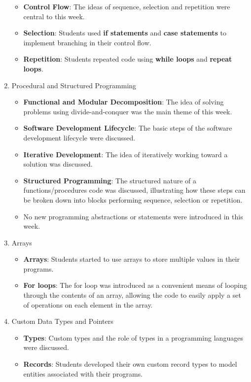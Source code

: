 \begin{enumerate}
  \begin{itemize}[noitemsep,nolistsep]
  	\item \textbf{Control Flow}: The ideas of sequence, selection and repetition were central to this week.
  	\item \textbf{Selection}: Students used \textbf{if statements} and  \textbf{case statements} to implement branching in their control flow.
  	\item \textbf{Repetition}: Students repeated code using \textbf{while loops} and \textbf{repeat loops}.
  \end{itemize}
  \item Procedural and Structured Programming
  \begin{itemize}[noitemsep,nolistsep]
  	\item \textbf{Functional and Modular Decomposition}: The idea of solving problems using divide-and-conquer was the main theme of this week.
  	\item \textbf{Software Development Lifecycle}: The basic steps of the software development lifecycle were discussed.
  	\item \textbf{Iterative Development}: The idea of iteratively working toward a solution was discussed.
  	\item \textbf{Structured Programming}: The structured nature of a functions/procedures code was discussed, illustrating how these steps can be broken down into blocks performing sequence, selection or repetition.
  	\item No new programming abstractions or statements were introduced in this week.
  \end{itemize}
  \item Arrays
  \begin{itemize}[noitemsep,nolistsep]
  	\item \textbf{Arrays}: Students started to use arrays to store multiple values in their programs.
  	\item \textbf{For loops}: The for loop was introduced as a convenient means of looping through the contents of an array, allowing the code to easily apply a set of operations on each element in the array.
  \end{itemize}
  \item Custom Data Types and Pointers
  \begin{itemize}[noitemsep,nolistsep]
  	\item \textbf{Types}: Custom types and the role of types in a programming languages were discussed.
  	\item \textbf{Records}: Students developed their own custom record types to model entities associated with their programs.

\end{itemize}
\end{enumerate}
